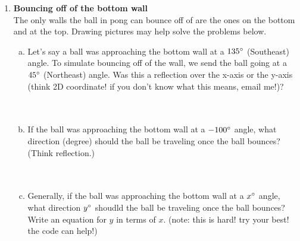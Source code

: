 \documentclass[11pt]{article}
\begin{document}
\begin{enumerate}
\item \textbf{Bouncing off of the bottom wall}\\
The only walls the ball in pong can bounce off of are the ones on the bottom and at the top. Drawing pictures may help solve the problems below.
\begin{enumerate}[a.]
\item Let's say a ball was approaching the bottom wall at a $135\degree$ (Southeast) angle. To simulate bouncing off of the wall, we send the ball going at a $45\degree$ (Northeast) angle. Was this a reflection over the x-axis or the y-axis (think 2D coordinate! if you don't know what this means, email me!)?\\\\\\
\item If the ball was approaching the bottom wall at a $-100 \degree$ angle, what direction (degree) should the ball be traveling once the ball bounces? (Think reflection.)\\\\\\
\item Generally, if the ball was approaching the bottom wall at a $x \degree$ angle, what direction $y \degree$ shoudld the ball be traveling once the ball bounces? Write an equation for $y$ in terms of $x$. (note: this is hard! try your best! the code can help!)\\\\\\\\\\\\\\\\\\\\\\
\end{enumerate}
\end{enumerate}
\end{document}

